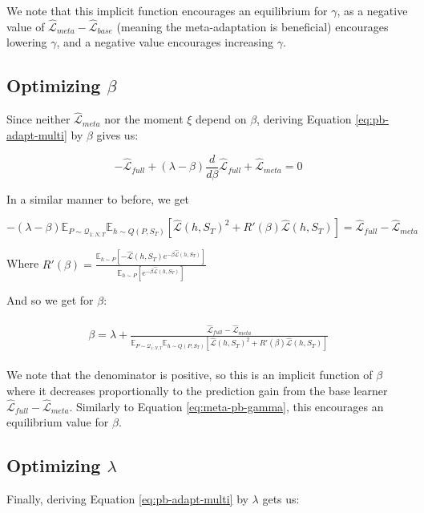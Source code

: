 \documentclass{article}
\theoremstyle{definition}
\newcommand{\Expect}[2]{\mathbb{E}_{#1}\left [#2 \right ]}
\begin{document}
We note that this implicit function encourages an equilibrium for $\gamma$, as a negative value of $\hat{\mathcal{L}}_{meta}-\hat{\mathcal{L}}_{base}$ (meaning the meta-adaptation is beneficial) encourages lowering $\gamma$, and a negative value encourages increasing $\gamma$.

\subsection{Optimizing $\beta$}

Since neither $\hat{\mathcal{L}}_{meta}$ nor the moment $\xi$ depend on $\beta$, deriving Equation \ref{eq:pb-adapt-multi} by $\beta$ gives us:

$$-\hat{\mathcal{L}}_{full}+(\lambda-\beta)\frac{d}{d\beta}\hat{\mathcal{L}}_{full}+\hat{\mathcal{L}}_{meta}=0 $$

In a similar manner to before, we get

$$-(\lambda-\beta)\mathbb{E}_{P\sim \mathcal{Q}_{1:N,T}}\Expect{h\sim Q(P,S_T)}{\hat{\mathcal{L}}(h,S_T)^2+R'(\beta)\hat{\mathcal{L}}(h, S_T) } =\hat{\mathcal{L}}_{full}-\hat{\mathcal{L}}_{meta} $$

Where $R'(\beta)=\frac{\Expect{h\sim P}{-\hat{\mathcal{L}}(h,S_T)e^{-\beta\hat{\mathcal{L}}(h,S_T)} }}{\Expect{h\sim P}{e^{-\beta\hat{\mathcal{L}}(h,S_T)} }}$

And so we get for $\beta$:

\begin{align} \label{eq:meta-pb-beta}
\begin{split}
\beta = \lambda+\frac{\hat{\mathcal{L}}_{full}-\hat{\mathcal{L}}_{meta}}{\mathbb{E}_{P\sim \mathcal{Q}_{1:N,T}}\Expect{h\sim Q(P,S_T)}{\hat{\mathcal{L}}(h,S_T)^2+R'(\beta)\hat{\mathcal{L}}(h, S_T) }}
\end{split}
\end{align}

We note that the denominator is positive, so this is an implicit function of $\beta$ where it decreases proportionally to the prediction gain from the base learner  $\hat{\mathcal{L}}_{full}-\hat{\mathcal{L}}_{meta}$. Similarly to Equation \ref{eq:meta-pb-gamma}, this encourages an equilibrium value for $\beta$.

\subsection{Optimizing $\lambda$}

Finally, deriving Equation \ref{eq:pb-adapt-multi} by $\lambda$ gets us:
\end{document}
